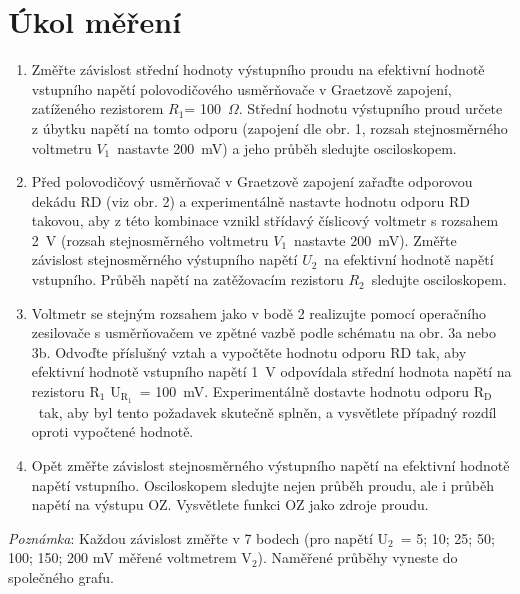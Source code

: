\documentclass[a4paper,12pt]{article}   %
\newcommand{\tsub}[1]{$_\textrm{#1}$}
\newcommand{\tohm}{$\Omega$}
\newcommand{\ri}{$R_1$}
\newcommand{\rii}{$R_2$}
\newcommand{\uii}{$U_2$}
\newcommand{\vii}{$V_1$}
\begin{document}
\section{Úkol měření}
\label{zadani}
\begin{enumerate}
    \item Změřte závislost střední hodnoty výstupního proudu na efektivní hodnotě vstupního napětí polovodičového usměrňovače v Graetzově zapojení, zatíženého rezistorem \ri = 100~\tohm. Střední hodnotu výstupního proud určete z úbytku napětí na tomto odporu (zapojení dle obr. 1, rozsah stejnosměrného voltmetru \vii~nastavte 200~mV) a jeho průběh sledujte osciloskopem.
    \item Před polovodičový usměrňovač v Graetzově zapojení zařaďte odporovou dekádu RD (viz obr. 2) a experimentálně nastavte hodnotu odporu RD takovou, aby z této kombinace vznikl střídavý číslicový voltmetr s rozsahem 2~V (rozsah stejnosměrného voltmetru \vii~nastavte 200~mV). Změřte závislost stejnosměrného výstupního napětí \uii~na efektivní hodnotě napětí vstupního. Průběh napětí na zatěžovacím rezistoru \rii~sledujte osciloskopem.
    \item Voltmetr se stejným rozsahem jako v bodě 2 realizujte pomocí operačního zesilovače s usměrňovačem ve zpětné vazbě podle schématu na obr. 3a nebo 3b. Odvoďte příslušný vztah a vypočtěte hodnotu odporu RD tak, aby efektivní hodnotě vstupního napětí 1~V odpovídala střední hodnota napětí na rezistoru R\tsub{1} U\tsub{R\tsub{1}}~= 100~mV. Experimentálně dostavte hodnotu odporu R\tsub{D}~tak, aby byl tento požadavek skutečně splněn, a vysvětlete případný rozdíl oproti vypočtené hodnotě.
    \item Opět změřte závislost stejnosměrného výstupního napětí na efektivní hodnotě napětí vstupního. Osciloskopem sledujte nejen průběh proudu, ale i průběh napětí na výstupu OZ. Vysvětlete funkci OZ jako zdroje proudu.
\end{enumerate}
\textit{Poznámka}: Každou závislost změřte v 7 bodech (pro napětí U\tsub{2}~= 5; 10; 25; 50; 100; 150; 200 mV měřené voltmetrem V\tsub{2}). Naměřené průběhy vyneste do společného grafu.
\end{document}
